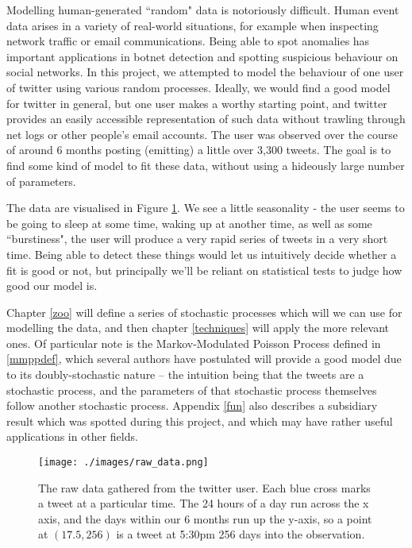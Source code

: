 Modelling human-generated ``random" data is notoriously difficult. Human event data arises in a variety of real-world situations, for example when inspecting network traffic or email communications. Being able to spot anomalies has important applications in botnet detection and spotting suspicious behaviour on social networks. In this project, we attempted to model the behaviour of one user of twitter using various random processes. Ideally, we would find a good model for twitter in general, but one user makes a worthy starting point, and twitter provides an easily accessible representation of such data without trawling through net logs or other people's email accounts. The user was observed over the course of around 6 months posting (emitting) a little over 3,300 tweets. The goal is to find some kind of model to fit these data, without using a hideously large number of parameters.

The data are visualised in Figure \ref{raw_data}. We see a little seasonality - the user seems to be going to sleep at some time, waking up at another time, as well as some ``burstiness", the user will produce a very rapid series of tweets in a very short time. Being able to detect these things would let us intuitively decide whether a fit is good or not, but principally we'll be reliant on statistical tests to judge how good our model is.

Chapter \ref{zoo} will define a series of stochastic processes which will we can use for modelling the data, and then chapter \ref{techniques} will apply the more relevant ones. Of particular note is the Markov-Modulated Poisson Process defined in \textsection\ref{mmppdef}, which several authors \cite{mmpp1}\cite{mmpp2}\cite{mmpp3} have postulated will provide a good model due to its doubly-stochastic nature -- the intuition being that the tweets are a stochastic process, and the parameters of that stochastic process themselves follow another stochastic process. Appendix \ref{fun} also describes a subsidiary result which was spotted during this project, and which may have rather useful applications in other fields.

\begin{figure}[h]
\texttt{[image: ./images/raw\_data.png]}
\caption{The raw data gathered from the twitter user. Each blue cross marks a tweet at a particular time. The 24 hours of a day run across the x axis, and the days within our 6 months run up the y-axis, so a point at $(17.5, 256)$ is a tweet at 5:30pm 256 days into the observation.}
\label{raw_data}
\end{figure}